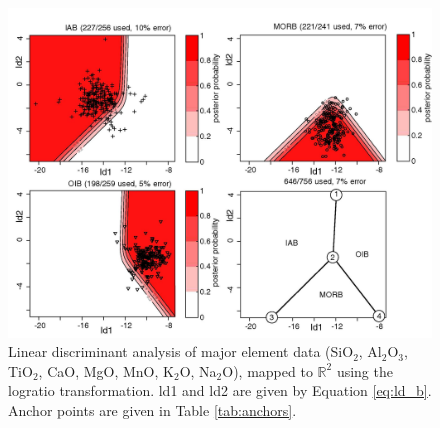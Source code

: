 \begin{figure}[htbp]
  \centering
  \includegraphics[width=600]{figures/discrimiFunc1.jpg}
  \caption[Linear discriminant analysis using major element data]{
Linear   discriminant  analysis  of   major  element   data  (SiO$_2$,
Al$_2$O$_3$,  TiO$_2$,  CaO, MgO,  MnO,  K$_2$O,  Na$_2$O), mapped  to
$\mathbb{R}^2$  using the  logratio  transformation. ld1  and ld2  are
given  by Equation  \ref{eq:ld_b}. Anchor  points are  given  in Table
\ref{tab:anchors}.}
  \label{fig:discrimiFunc2}
\end{figure}

\clearpage


